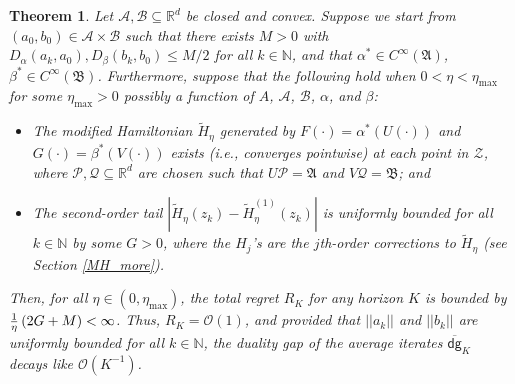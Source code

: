 \documentclass[11pt]{article}
\newtheorem{theorem}{Theorem}
\renewcommand{\P}{\mathcal{P}}
\newcommand{\R}{\mathbb{R}}
\newcommand{\Z}{\mathcal{Z}}
\newcommand{\N}{\mathbb{N}}
\newcommand{\A}{\mathcal{A}}
\newcommand{\B}{\mathcal{B}}
\newcommand{\Q}{\mathcal{Q}}
\newcommand{\lnorm}{\left|\left|}
\newcommand{\rnorm}{\right|\right|}
\newcommand{\dg}{\textsf{dg}}
\begin{document}
\begin{theorem}\label{absolute}
    Let $\mathcal{A},\mathcal{B}\subseteq \R^{d}$ be closed and convex. Suppose we start from $(a_{0},b_{0})\in\A\times\B$ such that there exists $M>0$ with $D_{\alpha}\left(a_k,a_{0}\right),D_{\beta}\left(b_k,b_{0}\right)\leq M/2$ for all $k\in\N$, and that $\alpha^{*}\in C^{\infty}\left(\mathfrak{A}\right)$, $\beta^{*}\in C^{\infty}\left(\mathfrak{B}\right)$. Furthermore, suppose that the following hold when $0<\eta<\eta_{\max}$ for some $\eta_{\max}>0$ possibly a function of $A$, $\A$, $\B$, $\alpha$, and $\beta$: 
    \begin{itemize}
        \item The modified Hamiltonian $\widetilde{H}_{\eta}$ generated by $F\left(\cdot\right)=\alpha^{*}\left(U\left(\cdot\right)\right)$ and $G\left(\cdot\right)=\beta^{*}\left(V\left(\cdot\right)\right)$ exists (i.e., converges pointwise) at each point in $\Z$, where $\P,\Q\subseteq\R^{d}$ are chosen such that $U\P=\mathfrak{A}$ and $V\Q=\mathfrak{B}$; and
        \item The second-order tail $\left|\widetilde{H}_{\eta}(z_k)-\widetilde{H}_{\eta}^{(1)}(z_k)\right|$ is uniformly bounded for all $k\in\N$ by some $G>0$, where the $H_{j}$'s are the $j$th-order corrections to $\widetilde{H}_{\eta}$ (see Section \ref{MH_more}).
    \end{itemize}
    Then, for all $\eta\in\left(0,\eta_{\max}\right)$, the total regret $R_{K}$ for any horizon $K$ is bounded by $\\ \frac{1}{\eta}\left(2G+M\right)<\infty$. Thus, $R_{K}=\mathcal{O}\left(1\right)$, and provided that $\lnorm a_k\rnorm$ and $\lnorm b_k\rnorm$ are uniformly bounded for all $k\in\N$, the duality gap of the average iterates $\overline{\dg}_{K}$ decays like $\mathcal{O}\left(K^{-1}\right)$. 
\end{theorem}
\end{document}
